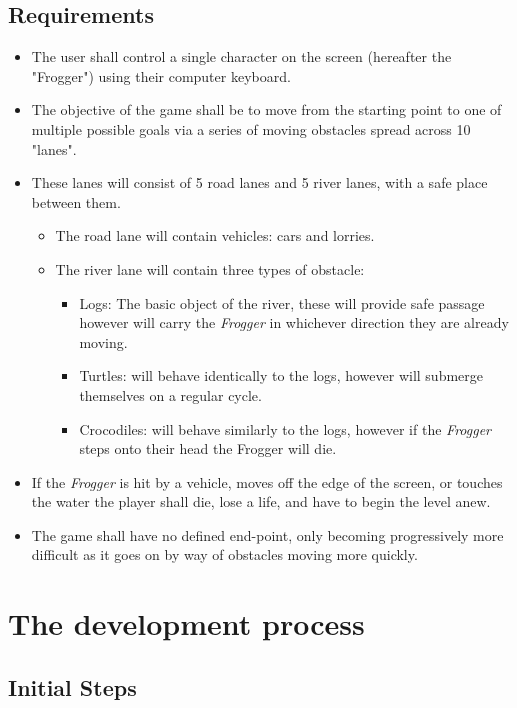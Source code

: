 \documentclass[12pt, a4paper]{report}
\begin{document}
\subsection{Requirements}
\begin{itemize}
  \item The user shall control a single character on the screen (hereafter the "Frogger") using their computer keyboard.
  \item The objective of the game shall be to move from the starting point to one of multiple possible goals via a series of moving obstacles spread across 10 "lanes".
  \item These lanes will consist of 5 road lanes and 5 river lanes, with a safe place between them.
    \begin{itemize}
      \item The road lane will contain vehicles: cars and lorries.
      \item The river lane will contain three types of obstacle:
        \begin{itemize}
          \item Logs: The basic object of the river, these will provide safe passage however will carry the \textit{Frogger} in whichever direction they are already moving.
          \item Turtles: will behave identically to the logs, however will submerge themselves on a regular cycle.
          \item Crocodiles: will behave similarly to the logs, however if the \textit{Frogger} steps onto their head the Frogger will die.
        \end{itemize}
    \end{itemize}
  \item If the \textit{Frogger} is hit by a vehicle, moves off the edge of the screen, or touches the water the player shall die, lose a life, and have to begin the level anew.
  \item The game shall have no defined end-point, only becoming progressively more difficult as it goes on by way of obstacles moving more quickly.
\end{itemize}

\section{The development process}

\subsection{Initial Steps}
\end{document}
